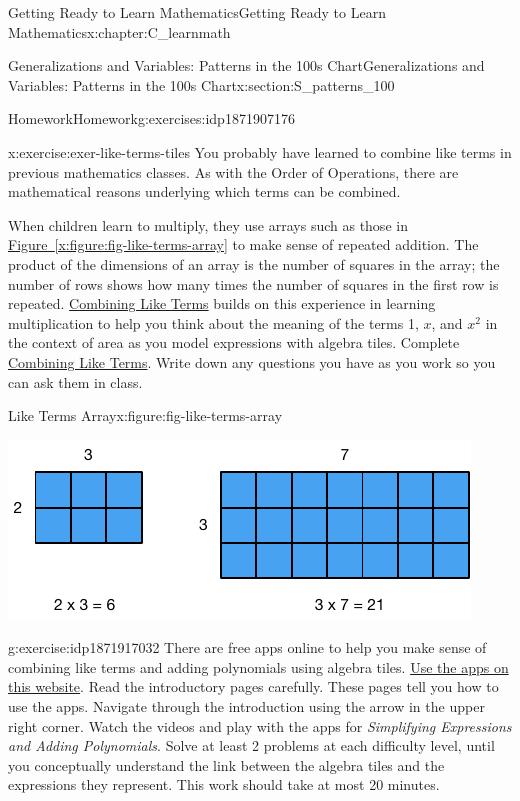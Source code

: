 \documentclass[oneside,10pt,]{book}
\newcommand{\xreffont}{\relax}
\newcommand{\pubtitle}[1]{\textsl{#1}}
\numberwithin{equation}{chapter}
\begin{document}
\begin{chapterptx}{Getting Ready to Learn Mathematics}{}{Getting Ready to Learn Mathematics}{}{}{x:chapter:C_learnmath}
\begin{sectionptx}{Generalizations and Variables: Patterns in the 100s Chart}{}{Generalizations and Variables: Patterns in the 100s Chart}{}{}{x:section:S_patterns_100}
\begin{exercises-subsection}{Homework}{}{Homework}{}{}{g:exercises:idp1871907176}
\begin{divisionexercise}{3}{}{}{x:exercise:exer-like-terms-tiles}
You probably have learned to combine like terms in previous mathematics classes. As with the Order of Operations, there are mathematical reasons underlying which terms can be combined.%
\par
When children learn to multiply, they use arrays such as those in \hyperref[x:figure:fig-like-terms-array]{Figure~{\xreffont\ref{x:figure:fig-like-terms-array}}} to make sense of repeated addition. The product of the dimensions of an array is the number of squares in the array; the number of rows shows how many times the number of squares in the first row is repeated. \hyperref[x:worksheet:act-like-terms]{Combining Like Terms} builds on this experience in learning multiplication to help you think about the meaning of the terms 1, \(x\), and \(x^2\) in the context of area as you model expressions with algebra tiles. Complete \hyperref[x:worksheet:act-like-terms]{Combining Like Terms}. Write down any questions you have as you work so you can ask them in class.%
\begin{figureptx}{Like Terms Array}{x:figure:fig-like-terms-array}{}%
\begin{image}{0.25}{0.5}{0.25}%
\includegraphics[width=\linewidth]{external/like-terms-array.pdf}
\end{image}%
\tcblower
\end{figureptx}%
\end{divisionexercise}%
\begin{divisionexercise}{4}{}{}{g:exercise:idp1871917032}%
There are free apps online to help you make sense of combining like terms and adding polynomials using algebra tiles. \href{http://media.mivu.org/mvu_pd/a4a/homework/index.html}{Use the apps on this website}\footnotemark{}. Read the introductory pages carefully. These pages tell you how to use the apps. Navigate through the introduction using the arrow in the upper right corner. Watch the videos and play with the apps for \pubtitle{Simplifying Expressions and Adding Polynomials}. Solve at least 2 problems at each difficulty level, until you conceptually understand the link between the algebra tiles and the expressions they represent. This work should take at most 20 minutes.%

\end{divisionexercise}
\end{exercises-subsection}
\end{sectionptx}
\end{chapterptx}
\end{document}
